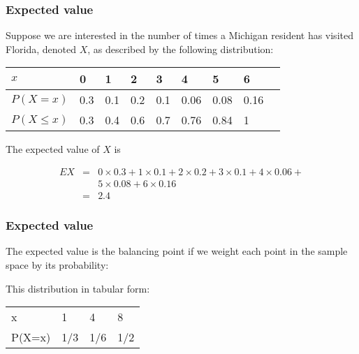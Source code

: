 \begin{frame}
\frametitle{Expected value}

Suppose we are interested in the number of times a Michigan resident
has visited Florida, denoted $X$, as described by the following
distribution:

\begin{center}
\begin{tabular}{lllllllll}
$x$         & 0   & 1 & 2 & 3 & 4 & 5 & 6\\\hline
$P(X=x)$    & 0.3 & 0.1 & 0.2 & 0.1 & 0.06 & 0.08 & 0.16\\
$P(X\le x)$ & 0.3 & 0.4 & 0.6 & 0.7 & 0.76 & 0.84 & 1\\\hline
\end{tabular}
\end{center}

The expected value of $X$ is

\begin{eqnarray*}
EX &=& 0\times 0.3 + 1\times 0.1 + 2\times 0.2 + 3\times 0.1 +
4\times 0.06 +\\&& 5\times 0.08 + 6\times 0.16\\
&=& 2.4
\end{eqnarray*}

\end{frame}

\begin{frame}
\frametitle{Expected value}

The expected value is the balancing point if we weight each point in
the sample space by its probability:


This distribution in tabular form:

\begin{center}
\begin{tabular}{llll}\hline
x      & 1 & 4 & 8\\
P(X=x) & 1/3 & 1/6 & 1/2\\\hline
\end{tabular}
\end{center}

\end{frame}

%
%
%
%
%

